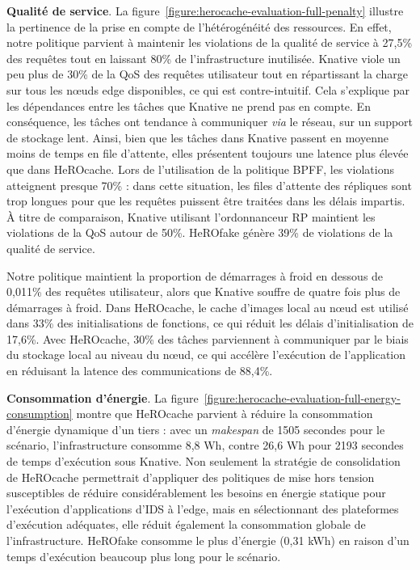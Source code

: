 {\textbf{Qualité de service}. La figure~\ref{figure:herocache-evaluation-full-penalty} illustre la pertinence de la prise en compte de l'hétérogénéité des ressources. En effet, notre politique parvient à maintenir les violations de la qualité de service à 27,5\% des requêtes tout en laissant 80\% de l'infrastructure inutilisée. Knative viole un peu plus de 30\% de la \gls{QoS} des requêtes utilisateur tout en répartissant la charge sur tous les nœuds edge disponibles, ce qui est contre-intuitif. Cela s'explique par les dépendances entre les tâches que Knative ne prend pas en compte. En conséquence, les tâches ont tendance à communiquer \textit{via} le réseau, sur un support de stockage lent. Ainsi, bien que les tâches dans Knative passent en moyenne moins de temps en file d'attente, elles présentent toujours une latence plus élevée que dans HeROcache. Lors de l'utilisation de la politique BPFF, les violations atteignent presque 70\% : dans cette situation, les files d'attente des répliques sont trop longues pour que les requêtes puissent être traitées dans les délais impartis. À titre de comparaison, Knative utilisant l'ordonnanceur RP maintient les violations de la \gls{QoS} autour de 50\%. HeROfake génère 39\% de violations de la qualité de service.

Notre politique maintient la proportion de démarrages à froid en dessous de 0,011\% des requêtes utilisateur, alors que Knative souffre de quatre fois plus de démarrages à froid. Dans HeROcache, le cache d'images local au nœud est utilisé dans 33\% des initialisations de fonctions, ce qui réduit les délais d'initialisation de 17,6\%.
Avec HeROcache, 30\% des tâches parviennent à communiquer par le biais du stockage local au niveau du nœud, ce qui accélère l'exécution de l'application en réduisant la latence des communications de 88,4\%.

\textbf{Consommation d'énergie}. La figure~\ref{figure:herocache-evaluation-full-energy-consumption} montre que HeROcache parvient à réduire la consommation d'énergie dynamique d'un tiers : avec un \textit{makespan} de 1505 secondes pour le scénario, l'infrastructure consomme 8,8 Wh, contre 26,6 Wh pour 2193 secondes de temps d'exécution sous Knative. Non seulement la stratégie de consolidation de HeROcache permettrait d'appliquer des politiques de mise hors tension susceptibles de réduire considérablement les besoins en énergie statique pour l'exécution d'applications d'\gls{IDS} à l'edge, mais en sélectionnant des plateformes d'exécution adéquates, elle réduit également la consommation globale de l'infrastructure. HeROfake consomme le plus d'énergie (0,31 kWh) en raison d'un temps d'exécution beaucoup plus long pour le scénario.

}
